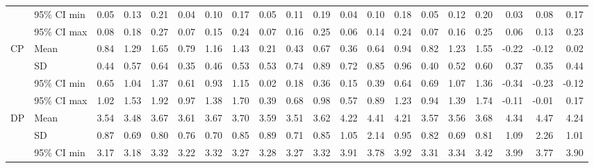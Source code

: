 \begin{longtable}{llrrrrrrrrrrrrrrrrrr}
    & 95\% CI min &       0.05 &       0.13 &       0.21 &       0.04 &       0.10 &       0.17 &       0.05 &       0.11 &       0.19 &       0.04 &       0.10 &       0.18 &       0.05 &       0.12 &       0.20 &       0.03 &       0.08 &       0.17 \\
    & 95\% CI max &       0.08 &       0.18 &       0.27 &       0.07 &       0.15 &       0.24 &       0.07 &       0.16 &       0.25 &       0.06 &       0.14 &       0.24 &       0.07 &       0.16 &       0.25 &       0.06 &       0.13 &       0.23 \\
\cline{1-20}
\multirow{4}{*}{CP} & Mean &       0.84 &       1.29 &       1.65 &       0.79 &       1.16 &       1.43 &       0.21 &       0.43 &       0.67 &       0.36 &       0.64 &       0.94 &       0.82 &       1.23 &       1.55 &      -0.22 &      -0.12 &       0.02 \\
    & SD &       0.44 &       0.57 &       0.64 &       0.35 &       0.46 &       0.53 &       0.53 &       0.74 &       0.89 &       0.72 &       0.85 &       0.96 &       0.40 &       0.52 &       0.60 &       0.37 &       0.35 &       0.44 \\
    & 95\% CI min &       0.65 &       1.04 &       1.37 &       0.61 &       0.93 &       1.15 &       0.02 &       0.18 &       0.36 &       0.15 &       0.39 &       0.64 &       0.69 &       1.07 &       1.36 &      -0.34 &      -0.23 &      -0.12 \\
    & 95\% CI max &       1.02 &       1.53 &       1.92 &       0.97 &       1.38 &       1.70 &       0.39 &       0.68 &       0.98 &       0.57 &       0.89 &       1.23 &       0.94 &       1.39 &       1.74 &      -0.11 &      -0.01 &       0.17 \\
\cline{1-20}
\multirow{4}{*}{DP} & Mean &       3.54 &       3.48 &       3.67 &       3.61 &       3.67 &       3.70 &       3.59 &       3.51 &       3.62 &       4.22 &       4.41 &       4.21 &       3.57 &       3.56 &       3.68 &       4.34 &       4.47 &       4.24 \\
    & SD &       0.87 &       0.69 &       0.80 &       0.76 &       0.70 &       0.85 &       0.89 &       0.71 &       0.85 &       1.05 &       2.14 &       0.95 &       0.82 &       0.69 &       0.81 &       1.09 &       2.26 &       1.01 \\
    & 95\% CI min &       3.17 &       3.18 &       3.32 &       3.22 &       3.32 &       3.27 &       3.28 &       3.27 &       3.32 &       3.91 &       3.78 &       3.92 &       3.31 &       3.34 &       3.42 &       3.99 &       3.77 &       3.90 \\

\end{longtable}
